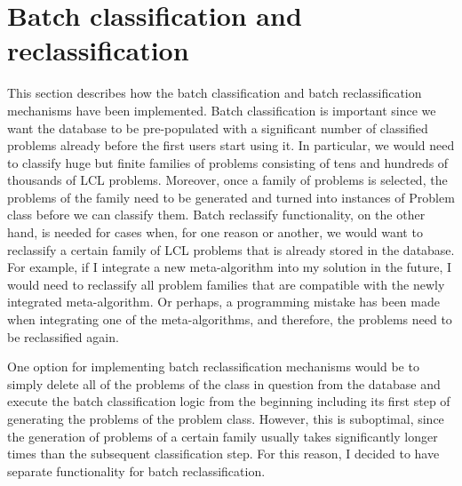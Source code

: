



  
  


\section{Batch classification and reclassification}

This section describes how the batch classification and
batch reclassification mechanisms have been implemented.
Batch classification is important since we want the database
to be pre-populated with a significant number of classified
problems already before the first users start using it.
In particular, we would need to classify huge but finite
families of problems consisting of tens and hundreds of
thousands of LCL problems. Moreover, once a family of
problems is selected, the problems of the family need to
be generated and turned into instances of Problem class before
we can classify them. Batch reclassify functionality,
on the other hand, is needed for cases when, for one reason
or another, we would want to reclassify a certain
family of LCL problems that is already stored in the
database. For example, if I integrate a new meta-algorithm
into my solution in the future, I would need to reclassify
all problem families that are compatible with the newly integrated
meta-algorithm. Or perhaps, a programming mistake has been
made when integrating one of the meta-algorithms, and therefore,
the problems need to be reclassified again.

One option for implementing batch reclassification
mechanisms would be to simply delete all of the problems
of the class in question from the database and execute
the batch classification logic from the beginning
including its first step of generating the problems
of the problem class. However, this is suboptimal,
since the generation of problems of a certain family
usually takes significantly longer times than
the subsequent classification step. For this reason,
I decided to have separate functionality for
batch reclassification.

